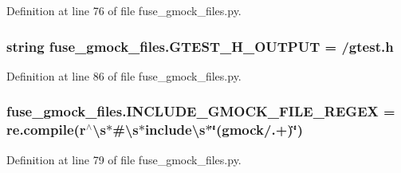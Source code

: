 Definition at line 76 of file fuse\+\_\+gmock\+\_\+files.\+py.

\subsubsection[{\texorpdfstring{G\+T\+E\+S\+T\+\_\+\+H\+\_\+\+O\+U\+T\+P\+UT}{GTEST_H_OUTPUT}}]{\setlength{\rightskip}{0pt plus 5cm}string fuse\+\_\+gmock\+\_\+files.\+G\+T\+E\+S\+T\+\_\+\+H\+\_\+\+O\+U\+T\+P\+UT = /{\bf gtest.\+h}\textquotesingle{}}\hypertarget{namespacefuse__gmock__files_a385c31d8542b0a2e4b7f46cb2a32d7da}{}\label{namespacefuse__gmock__files_a385c31d8542b0a2e4b7f46cb2a32d7da}


Definition at line 86 of file fuse\+\_\+gmock\+\_\+files.\+py.

\subsubsection[{\texorpdfstring{I\+N\+C\+L\+U\+D\+E\+\_\+\+G\+M\+O\+C\+K\+\_\+\+F\+I\+L\+E\+\_\+\+R\+E\+G\+EX}{INCLUDE_GMOCK_FILE_REGEX}}]{\setlength{\rightskip}{0pt plus 5cm}fuse\+\_\+gmock\+\_\+files.\+I\+N\+C\+L\+U\+D\+E\+\_\+\+G\+M\+O\+C\+K\+\_\+\+F\+I\+L\+E\+\_\+\+R\+E\+G\+EX = re.\+compile(r\textquotesingle{}$^\wedge$\textbackslash{}s$\ast$\#\textbackslash{}s$\ast$include\textbackslash{}s$\ast$\char`\"{}(gmock/.+)\char`\"{}\textquotesingle{})}\hypertarget{namespacefuse__gmock__files_aeb4457451f878d6bc8a42f7ff3e5f6cf}{}\label{namespacefuse__gmock__files_aeb4457451f878d6bc8a42f7ff3e5f6cf}


Definition at line 79 of file fuse\+\_\+gmock\+\_\+files.\+py.

